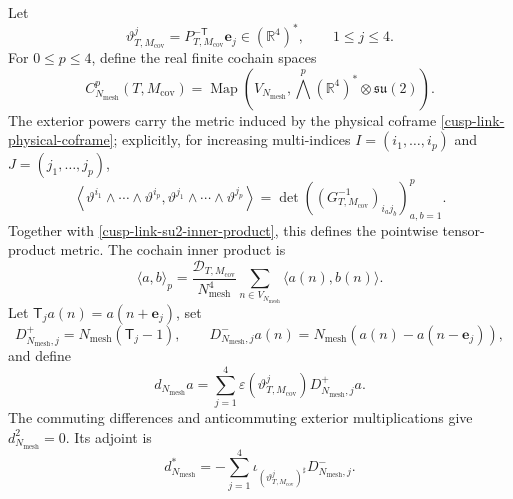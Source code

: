Let
\begin{equation}
 \vartheta^j_{T,M_{\mathrm{cov}}}
 =P_{T,M_{\mathrm{cov}}}^{-\mathsf T}\mathbf e_j
 \in(\mathbb R^4)^*,
 \qquad 1\leq j\leq4.
 \label{cusp-link-physical-coframe}
\end{equation}
For \(0\leq p\leq4\), define the real finite cochain spaces
\begin{equation}
 C^p_{N_{\mathrm{mesh}}}(T,M_{\mathrm{cov}})
 =\operatorname{Map}\left(
 V_{N_{\mathrm{mesh}}},
 \bigwedge^p(\mathbb R^4)^*\otimes\mathfrak{su}(2)
 \right).
 \label{cusp-link-cochain-spaces}
\end{equation}
The exterior powers carry the metric induced by the physical coframe
\eqref{cusp-link-physical-coframe}; explicitly, for increasing multi-indices
\(I=(i_1,\ldots,i_p)\) and \(J=(j_1,\ldots,j_p)\),
\begin{equation}
 \left\langle
  \vartheta^{i_1}\wedge\cdots\wedge\vartheta^{i_p},
  \vartheta^{j_1}\wedge\cdots\wedge\vartheta^{j_p}
 \right\rangle
 =
 \det\left((G_{T,M_{\mathrm{cov}}}^{-1})_{i_a j_b}\right)_{a,b=1}^p.
 \label{cusp-link-exterior-metric}
\end{equation}
Together with \eqref{cusp-link-su2-inner-product}, this defines the
pointwise tensor-product metric.  The cochain inner product is
\begin{equation}
 \langle a,b\rangle_p
 =\frac{\mathcal D_{T,M_{\mathrm{cov}}}}{N_{\mathrm{mesh}}^4}
   \sum_{n\in V_{N_{\mathrm{mesh}}}}
   \langle a(n),b(n)\rangle.
 \label{cusp-link-cochain-inner-product}
\end{equation}
Let \(\mathsf T_j a(n)=a(n+\mathbf e_j)\), set
\begin{equation}
 D^+_{N_{\mathrm{mesh}},j}
 =N_{\mathrm{mesh}}(\mathsf T_j-1),
 \qquad
 D^-_{N_{\mathrm{mesh}},j}a(n)
 =N_{\mathrm{mesh}}(a(n)-a(n-\mathbf e_j)),
 \label{cusp-link-differences}
\end{equation}
and define
\begin{equation}
 d_{N_{\mathrm{mesh}}}a
 =\sum_{j=1}^4
  \varepsilon(\vartheta^j_{T,M_{\mathrm{cov}}})
  D^+_{N_{\mathrm{mesh}},j}a.
 \label{cusp-link-finite-exterior-derivative}
\end{equation}
The commuting differences and anticommuting exterior multiplications give
\(d_{N_{\mathrm{mesh}}}^2=0\).  Its adjoint is
\begin{equation}
 d_{N_{\mathrm{mesh}}}^*
 =-\sum_{j=1}^4
  \iota_{(\vartheta^j_{T,M_{\mathrm{cov}}})^\sharp}
  D^-_{N_{\mathrm{mesh}},j}.
 \label{cusp-link-finite-adjoint}
\end{equation}
